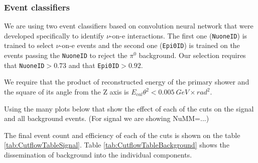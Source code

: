 \subsubsection*{Event classifiers}

We are using two event classifiers based on convolution neural network that were developed specifically to identify $\nu$-on-e interactions. The first one (\texttt{NuoneID}) is trained to select $\nu$-on-e events and the second one (\texttt{Epi0ID}) is trained on the events passing the \texttt{NuoneID} to reject the $\pi^0$ background. Our selection requires that \texttt{NuoneID}$>0.73$ and that \texttt{Epi0ID}$>0.92$.

We require that the product of reconstructed energy of the primary shower and the square of its angle from the Z axis is $E_{cal}\theta^2<0.005\ \unit{GeV\times rad^2}$.


Using the many plots below that show the effect of each of the cuts on the signal and all background events. (For signal we are showing NuMM=...)

The final event count and efficiency of each of the cuts is shown on the table \ref{tab:CutflowTableSignal}. Table \ref{tab:CutflowTableBackground} shows the dissemination of background into the individual components.

